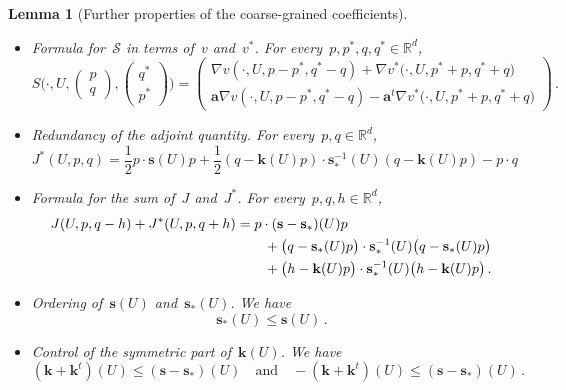 \documentclass[11pt,twoside]{article} %
\numberwithin{equation}{section}
\newtheorem{lemma}[theorem]{Lemma}
\theoremstyle{definition}
\newcommand*{\Rd}{\ensuremath{\mathbb{R}^d}}
\newcommand{\s}{\mathbf{s}}
\renewcommand{\a}{\mathbf{a}}
\renewcommand{\k}{\mathbf{k}}
\renewcommand{\S}{\mathcal{S}}
\begin{document}
\begin{lemma}[Further properties of the coarse-grained coefficients]
\begin{itemize}
\item \emph{Formula for~$\S$ in terms of~$v$ and~$v^*$}. For every~$p,p^*,q,q^*\in\Rd$, 
\begin{equation}
\label{e.maximizers.J.to.bfJ}
S
\biggl(\cdot,U, \begin{pmatrix} p  \\ q \end{pmatrix}, \begin{pmatrix} q^* \\ p^* \end{pmatrix} \biggr)
=
\begin{pmatrix} \nabla v (\cdot,U,p{-}p^*,q^*{-}q)
+ 
\nabla v^*\bigl(\cdot,U,p^*{+}p,q^*{+}q\bigr) \\ 
\a \nabla v (\cdot,U,p{-}p^*,q^*{-}q)
- 
\a^t \nabla v^*\bigl(\cdot,U,p^*{+}p,q^*{+}q\bigr)
\end{pmatrix}
\,.
\end{equation}




\item \emph{Redundancy of the adjoint quantity.}
For every~$p,q\in \Rd$,
\begin{equation}
\label{e.Jaas.nosymm.star}
J^*(U,p,q) = 
\frac 12p \cdot \s(U)p 
+ \frac 12 (q -\k(U) p) \cdot \s_*^{-1}(U) (q -\k(U) p) 
- p \cdot q 
\end{equation}

\item \emph{Formula for the sum of~$J$ and~$J^*$.} For every~$p,q,h\in\Rd$,
\begin{align}
\label{e.JJstar1}
J(U,p,q-h) + J^*(U,p,q+h)
&
=
p \cdot (\s -\s_*)(U)p
\notag \\ & \qquad
+
\bigl (q - \s_*(U)p\bigr )\cdot \s_*^{-1}(U) \bigl (q - \s_*(U)p\bigr )
\notag \\ & \qquad
+
\bigl ( h-\k(U)p \bigr )  \cdot \s_*^{-1}(U)\bigl ( h-\k(U) p\bigr ) 
\,.
\end{align}

\item \emph{Ordering of~$\s(U)$ and~$\s_*(U)$.} We have
\begin{equation}
\label{e.nonobvious.ordering}
\s_*(U) \leq \s(U)
\,.
\end{equation}

\item \emph{Control of the symmetric part of~$\k(U)$.} We have
\begin{equation}
\label{e.ksym.by.sss}
(\k+\k^t)(U) \leq (\s-\s_*)(U)
\quad \mbox{and} \quad
-(\k+\k^t)(U) \leq (\s-\s_*)(U)\,.
\end{equation}


\end{itemize}
\end{lemma}
\end{document}
